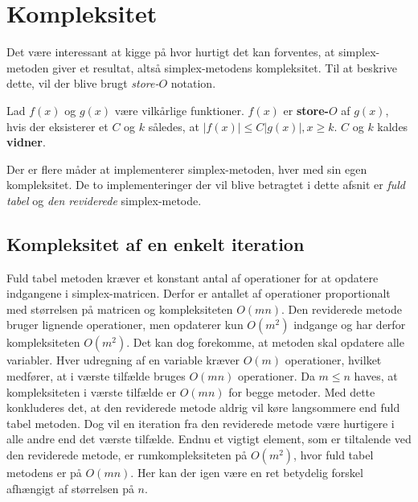\section{Kompleksitet}
Det være interessant at kigge på hvor hurtigt det kan forventes, at simplex-metoden giver et resultat, altså simplex-metodens kompleksitet.
Til at beskrive dette, vil der blive brugt \textit{store-$O$} notation.
%
\begin{defn}{}{}
Lad $f(x)$ og $g(x)$ være vilkårlige funktioner. $f(x)$ er \textbf{store-$O$} af $g(x)$, hvis der eksisterer et $C$ og $k$ således, at $|f(x)| \leq C|g(x)|, x \geq k$. $C$ og $k$ kaldes \textbf{vidner}.
\end{defn}\noindent
%
Der er flere måder at implementerer simplex-metoden, hver med sin egen kompleksitet.
De to implementeringer der vil blive betragtet i dette afsnit er \textit{fuld tabel} og \textit{den reviderede} simplex-metode.
%
\subsection{Kompleksitet af en enkelt iteration}
%
Fuld tabel metoden kræver et konstant antal af operationer for at opdatere indgangene i simplex-matricen.
Derfor er antallet af operationer proportionalt med størrelsen på matricen og kompleksiteten $O(mn)$.
Den reviderede metode bruger lignende operationer, men opdaterer kun $O(m^2)$ indgange og har derfor kompleksiteten $O(m^2)$.
Det kan dog forekomme, at metoden skal opdatere alle variabler.
Hver udregning af en variable kræver $O(m)$ operationer, hvilket medfører, at i værste tilfælde bruges $O(mn)$ operationer.
Da $m \leq n$ haves, at kompleksiteten i værste tilfælde er $O(mn)$ for begge metoder.
Med dette konkluderes det, at den reviderede metode aldrig vil køre langsommere end fuld tabel metoden.
Dog vil en iteration fra den reviderede metode være hurtigere i alle andre end det værste tilfælde.
Endnu et vigtigt element, som er tiltalende ved den reviderede metode, er rumkompleksiteten på $O(m^2)$, hvor fuld tabel metodens er på $O(mn)$.
Her kan der igen være en ret betydelig forskel afhængigt af størrelsen på $n$.